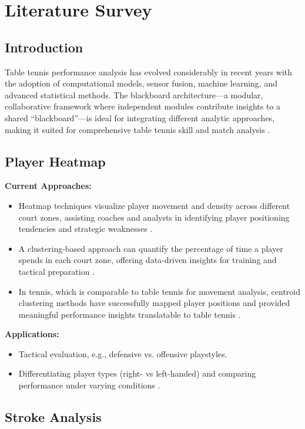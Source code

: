 \documentclass{article}
\begin{document}
\section{Literature Survey}

\subsection{Introduction}
Table tennis performance analysis has evolved considerably in recent years with the adoption of computational models, sensor fusion, machine learning, and advanced statistical methods. The blackboard architecture---a modular, collaborative framework where independent modules contribute insights to a shared ``blackboard''---is ideal for integrating different analytic approaches, making it suited for comprehensive table tennis skill and match analysis \cite{tamaki2017, sanusi2021}.

\subsection{Player Heatmap}

\textbf{Current Approaches:}
\begin{itemize}
    \item Heatmap techniques visualize player movement and density across different court zones, assisting coaches and analysts in identifying player positioning tendencies and strategic weaknesses \cite{boonim2023, heatmap2021}.
    \item A clustering-based approach can quantify the percentage of time a player spends in each court zone, offering data-driven insights for training and tactical preparation \cite{boonim2023}.
    \item In tennis, which is comparable to table tennis for movement analysis, centroid clustering methods have successfully mapped player positions and provided meaningful performance insights translatable to table tennis \cite{boonim2023}.
\end{itemize}
\textbf{Applications:}
\begin{itemize}
    \item Tactical evaluation, e.g., defensive vs. offensive playstyles.
    \item Differentiating player types (right- vs left-handed) and comparing performance under varying conditions \cite{heatmap2021}.
\end{itemize}

\subsection{Stroke Analysis}
\end{document}
